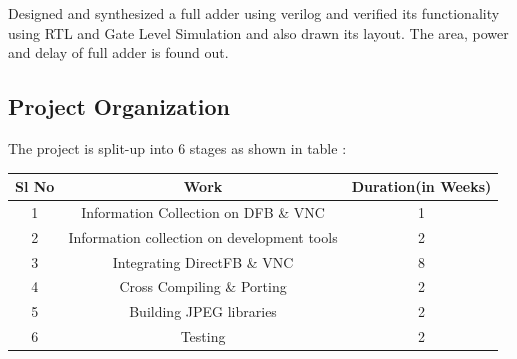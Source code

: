 Designed and synthesized  a full adder using  verilog and verified its functionality using RTL and Gate Level Simulation and also drawn its layout.  The area, power and delay of full adder is found out.



\subsection{Project Organization}
	The project is split-up into 6 stages as shown in table :\\
	
\begin{tabular}{|c|c|c|}\hline
Sl No&Work& Duration(in Weeks)\\ \hline \normalsize
1&Information Collection on DFB \& VNC&1 \\ \hline
2&Information collection on development tools&2\\ \hline
3&Integrating DirectFB \& VNC&8\\ \hline
4&Cross Compiling \& Porting&2\\ \hline
5&Building JPEG libraries&2\\ \hline
6&Testing&2\\ \hline
\end{tabular}


